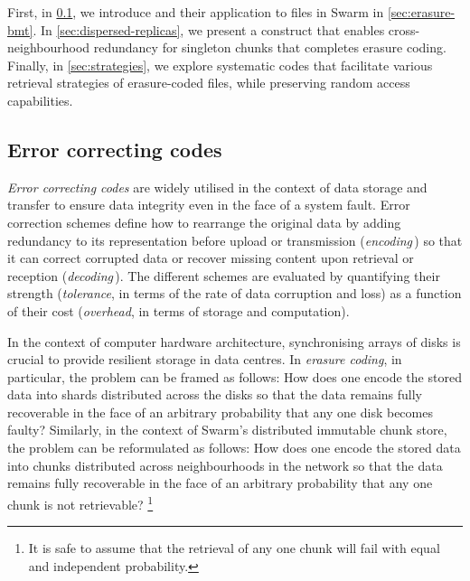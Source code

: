 First, in \ref{sec:error-correcting-codes}, we introduce  and their application to files in Swarm in \ref{sec:erasure-bmt}. In \ref{sec:dispersed-replicas}, we present a construct that enables cross-neighbourhood redundancy for singleton chunks that completes erasure coding. Finally, in \ref{sec:strategies}, we explore systematic codes that facilitate various retrieval strategies of erasure-coded files, while preserving random access capabilities.

\subsection{Error correcting codes \statusgreen}\label{sec:error-correcting-codes}
%

\emph{Error correcting codes} are widely utilised in the context of data storage and transfer to ensure data integrity even in the face of a system fault. Error correction schemes define how to rearrange the original data by adding redundancy to its representation before upload or transmission (\emph{encoding}\,) so that it can correct corrupted data or recover missing content upon retrieval or reception (\emph{decoding}\,). The different schemes are evaluated by quantifying their strength (\emph{tolerance}, in terms of the rate of data corruption and loss) as a function of their cost (\emph{overhead}, in terms of storage and computation). 

In the context of  computer hardware architecture, synchronising arrays of disks is crucial to provide resilient storage in data centres.
In \emph{erasure coding}, %
%
%
in particular, the problem can be framed as follows: How does one encode the stored data into shards distributed across the disks so that the data remains fully recoverable in the face of an arbitrary probability that any one disk becomes faulty?
Similarly, in the context of Swarm's distributed immutable chunk store, the problem can be reformulated as follows: How does one encode the stored data into chunks distributed across neighbourhoods in the network so that the data remains fully recoverable in the face of an arbitrary probability that any one chunk is not retrievable?%
%
\footnote{%
It is safe to assume that the retrieval of any one chunk will fail with equal and independent probability.}

